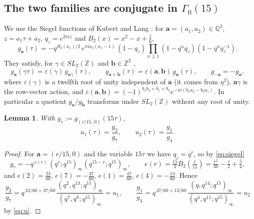 \documentclass[pdflatex,sn-mathphys-num]{sn-jnl}
\theoremstyle{thmstyleone}%
\newtheorem{lemma}[theorem]{Lemma}%
\theoremstyle{thmstyletwo}%
\begin{document}
\subsection{The two families are conjugate in $\Gamma_0(15)$}
We use the Siegel functions of Kubert and Lang \cite[Chapter~2]{KL}: for $\mathbf a=(a_1,a_2)\in\mathbb{Q}^2$, $z=a_1\tau+a_2$, $q_z=e^{2\pi iz}$ and $B_2(x)=x^2-x+\frac16$,
\begin{equation}\label{eq:siegel}
g_{\mathbf a}(\tau)=-q^{B_2(a_1)/2}\,e^{\pi i a_2(a_1-1)}\,(1-q_z)\prod_{n\ge1}(1-q^nq_z)(1-q^nq_z^{-1}).
\end{equation}
They satisfy, for $\gamma\in SL_2(\mathbb{Z})$ and $\mathbf b\in\mathbb{Z}^2$ \cite[Chapter~2, (K1), (K2)]{KL},
\begin{equation}\label{eq:K}
g_{\mathbf a}(\gamma\tau)=\varepsilon(\gamma)\,g_{\mathbf a\gamma}(\tau),\qquad
g_{\mathbf a+\mathbf b}(\tau)=\varepsilon(\mathbf a,\mathbf b)\,g_{\mathbf a}(\tau),\qquad
g_{-\mathbf a}=-g_{\mathbf a},
\end{equation}
where $\varepsilon(\gamma)$ is a twelfth root of unity independent of $\mathbf a$ (it comes from $\eta^2$), $\mathbf a\gamma$ is the row-vector action, and
$\varepsilon(\mathbf a,\mathbf b)=(-1)^{b_1b_2+b_1+b_2}e^{-\pi i(b_1a_2-b_2a_1)}$.
In particular a quotient $g_{\mathbf a}/g_{\mathbf b}$ transforms under $SL_2(\mathbb{Z})$ without any root of unity.

\begin{lemma}\label{lem:siegel}
With $g_r:=g_{(r/15,\,0)}(15\tau)$,
\[
u_1(\tau)=\frac{g_2}{g_7},\qquad u_2(\tau)=\frac{g_1}{g_4}.
\]
\end{lemma}
\begin{proof}
For $\mathbf a=(r/15,0)$ and the variable $15\tau$ we have $q_z=q^{r}$, so by \eqref{eq:siegel}
\[
g_r=-q^{\,e(r)}\,(q^{r};q^{15})_\infty(q^{15-r};q^{15})_\infty,\qquad
e(r)=\tfrac{15}{2}B_2(\tfrac{r}{15})=\tfrac{r^2}{30}-\tfrac r2+\tfrac54,
\]
and $e(2)=\frac{23}{60}$, $e(7)=-\frac{37}{60}$, $e(1)=\frac{47}{60}$, $e(4)=-\frac{13}{60}$. Hence
\[
\frac{g_2}{g_7}=q^{\,23/60+37/60}\,\frac{(q^2,q^{13};q^{15})_\infty}{(q^7,q^8;q^{15})_\infty}=u_1,\qquad
\frac{g_1}{g_4}=q^{\,47/60+13/60}\,\frac{(q,q^{14};q^{15})_\infty}{(q^4,q^{11};q^{15})_\infty}=u_2
\]
by \eqref{eq:u}.
\end{proof}
\end{document}
